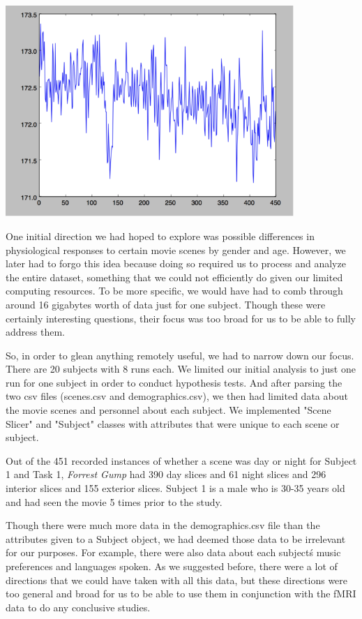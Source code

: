 \documentclass[11pt]{article}
\begin{document}
\begin{center}
\includegraphics[height=8cm]{8}
\end{center}

One initial direction we had hoped to explore was possible differences in
physiological responses to certain movie scenes by gender and age. However, we
later had to forgo this idea because doing so required us to process and
analyze the entire dataset, something that we could not efficiently do given
our limited computing resources. To be more specific, we would have had to
comb through around 16 gigabytes worth of data just for one subject. Though
these were certainly interesting questions, their focus was too broad for us
to be able to fully address them.

So, in order to glean anything remotely useful, we had to narrow down our
focus. There are 20 subjects with 8 runs each. We limited our initial analysis
to just one run for one subject in order to conduct hypothesis tests. And
after parsing the two csv files (scenes.csv and demographics.csv), we then had
limited data about the movie scenes and personnel about each subject. We
implemented "Scene Slicer" and "Subject" classes with attributes that were
unique to each scene or subject.

Out of the 451 recorded instances of whether a scene was day or night for
Subject 1 and Task 1, \emph{Forrest Gump} had 390 day slices and 61 night slices and 296 interior slices and 155 exterior slices. Subject 1 is a male 
who is 30-35 years old and had seen the movie 5 times prior to the study.

Though there were much more data in the demographics.csv file than the
attributes given to a Subject object, we had deemed those data to be
irrelevant for our purposes. For example, there were also data about each
subject\'s music preferences and languages spoken. As we suggested before,
there were a lot of directions that we could have taken with all this data,
but these directions were too general and broad for us to be able to use them
in conjunction with the fMRI data to do any conclusive studies.
\end{document}
